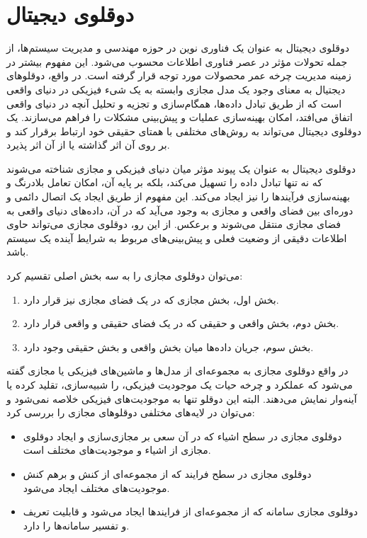 \section{دوقلوی دیجیتال}

دوقلوی دیجیتال به عنوان یک فناوری نوین در حوزه مهندسی و مدیریت سیستم‌ها، از جمله تحولات مؤثر در عصر فناوری اطلاعات محسوب می‌شود. این مفهوم بیشتر در زمینه مدیریت چرخه عمر محصولات
مورد توجه قرار گرفته است. 
در واقع، دوقلوهای دیجتیال به معنای وجود یک مدل مجازی وابسته به یک شیء فیزیکی در دنیای واقعی است که از طریق تبادل داده‌ها، همگام‌سازی و تجزیه و تحلیل آنچه در دنیای واقعی اتفاق می‌افتد، امکان بهینه‌سازی عملیات و پیش‌بینی مشکلات را فراهم می‌سازند. یک دوقلوی دیجیتال می‌تواند به روش‌های مختلفی با همتای حقیقی خود ارتباط برقرار کند و بر روی آن اثر گذاشته یا از آن اثر پذیرد.

دوقلوی دیجیتال به عنوان یک پیوند مؤثر میان دنیای فیزیکی و مجازی شناخته می‌شوند که نه تنها تبادل داده‌ را تسهیل می‌کند، بلکه بر پایه آن، امکان تعامل بلادرنگ و بهینه‌سازی فرآیندها را نیز ایجاد می‌کند.
\cite{b2}
این مفهوم از طریق ایجاد یک اتصال دائمی و دوره‌ای بین فضای واقعی و مجازی به وجود می‌آید که در آن، داده‌های دنیای واقعی به فضای مجازی منتقل می‌شوند و برعکس. 
از این رو، دوقلوی مجازی می‌تواند حاوی اطلاعات دقیقی از وضعیت فعلی و پیش‌بینی‌های مربوط به شرایط آینده یک سیستم باشد.

می‌توان دوقلوی مجازی را به سه بخش اصلی تقسیم کرد:
\cite{b2}
\begin{enumerate}
	\item 
	بخش اول، بخش مجازی که در یک فضای مجازی نیز قرار دارد.
	\item 
	بخش دوم، بخش واقعی و حقیقی که در یک فضای حقیقی و واقعی قرار دارد.
	\item 
	بخش سوم، جریان داده‌ها میان بخش واقعی و بخش حقیقی وجود دارد.
\end{enumerate}

در واقع دوقلوی مجازی به مجموعه‌ای از مدل‌‌ها و ماشین‌های فیزیکی یا مجازی گفته می‌شود که عملکرد و چرخه حیات یک موجودیت فیزیکی، را شبیه‌سازی، تقلید کرده یا آینه‌وار نمایش می‌دهند. البته این دوقلو تنها به موجودیت‌های فیزیکی خلاصه نمی‌شود و می‌توان در لایه‌های مختلفی دوقلو‌های مجازی را بررسی کرد:
\begin{itemize}
	\item 
	دوقلوی مجازی در سطح اشیاء که در آن سعی بر مجازی‌سازی و ایجاد دوقلوی مجازی از اشیاء و موجودیت‌های مختلف است.
	\item 
	دوقلوی مجازی در سطح فرایند که از مجموعه‌ای از کنش‌ و برهم‌ کنش موجودیت‌های مختلف ایجاد می‌شود.
	\item 
	دوقلوی مجازی سامانه که از مجموعه‌ای از فرایند‌ها ایجاد می‌شود و قابلیت تعریف و تفسیر سامانه‌ها را دارد.
\end{itemize}

